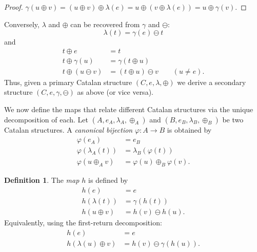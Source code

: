 \documentclass[a4paper,11pt]{article}
\theoremstyle{definition}
\newtheorem{definition}[theorem]{Definition}
\begin{document}
\begin{proof}
$\gamma(u \oplus v) = (u \oplus v) \oplus \lambda(e)
  = u \oplus (v \oplus \lambda(e))
  = u \oplus \gamma(v)$.
\end{proof}

Conversely, $\lambda$ and $\oplus$ can be recovered from
$\gamma$ and $\ominus$:
\[
  \lambda(t) = \gamma(e) \ominus t
\]
and
\begin{align*}
  t \oplus e &= t \\
  t \oplus \gamma(u) &= \gamma(t \oplus u) \\
  t \oplus (u \ominus v) &= (t \oplus u) \ominus v \qquad (u \neq e).
\end{align*}
Thus, given a primary Catalan structure
$(C,e,\lambda,\oplus)$ we derive a secondary structure
$(C,e,\gamma,\ominus)$ as above (or vice versa).

We now define the maps that relate different Catalan
structures via the unique decomposition of each.
Let $(A,e_A,\lambda_A,\oplus_A)$ and
$(B,e_B,\lambda_B,\oplus_B)$ be two Catalan
structures. A \emph{canonical bijection}
$\varphi : A \to B$ is obtained by
\begin{align*}
  \varphi(e_A) &= e_B \\
  \varphi(\lambda_A(t)) &= \lambda_B(\varphi(t)) \\
  \varphi(u \oplus_A v)
    &= \varphi(u) \oplus_B \varphi(v).
\end{align*}

\begin{definition}\label{def:h}\label{def:h-def}
The \emph{map $h$} is defined by
\begin{align*}
  h(e) &= e \\
  h(\lambda(t)) &= \gamma(h(t)) \\
  h(u \oplus v) &= h(v) \ominus h(u).
\end{align*}
Equivalently, using the first-return decomposition:
\begin{align*}
  h(e) &= e \\
  h(\lambda(u) \oplus v)
    &= h(v) \ominus \gamma(h(u)).
\end{align*}
\end{definition}
\end{document}
